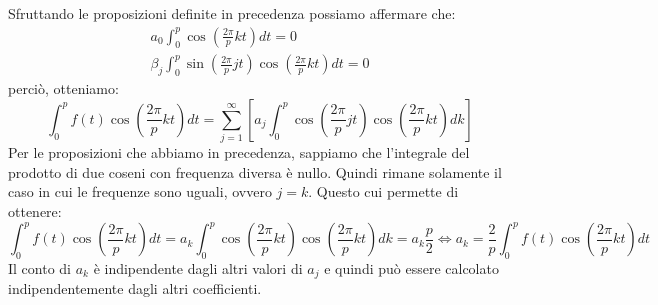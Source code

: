 Sfruttando le proposizioni definite in precedenza possiamo affermare che:
\begin{equation*}
    \begin{array}{c}
        a_0\int_{0}^{p}\cos \left(\frac{2\pi}{p}kt\right)dt = 0 \\
        \beta_j\int_{0}^{p}\sin\left(\frac{2\pi}{p}jt\right)\cos \left(\frac{2\pi}{p}kt\right)dt=0
    \end{array}
\end{equation*}
perciò, otteniamo:
\begin{equation*}
    \int_{0}^{p}f(t)\cos \left(\frac{2\pi}{p}kt\right) dt = \sum_{j=1}^{\infty}
    \left[a_j\int_{0}^{p}\cos \left(\frac{2\pi}{p}jt\right)\cos \left(
        \frac{2\pi}{p}kt\right)dk \right]
\end{equation*}
Per le proposizioni che abbiamo in precedenza, sappiamo che l'integrale del prodotto
di due coseni con frequenza diversa è nullo. Quindi rimane solamente il caso in
cui le frequenze sono uguali, ovvero $j=k$. Questo cui permette di ottenere:
\begin{equation*}
    \int_{0}^{p}f(t)\cos \left(\frac{2\pi}{p}kt\right) dt = a_k\int_{0}^{p}\cos
    \left(\frac{2\pi}{p}kt\right)\cos \left(\frac{2\pi}{p}kt\right)dk = a_k \frac{p}{2}
    \iff a_k =\frac{2}{p}  \int_{0}^{p}f(t)\cos \left(\frac{2\pi}{p}kt\right) dt
\end{equation*}
Il conto di $a_k$ è indipendente dagli altri valori di $a_j$ e quindi può essere
calcolato indipendentemente dagli altri coefficienti.

